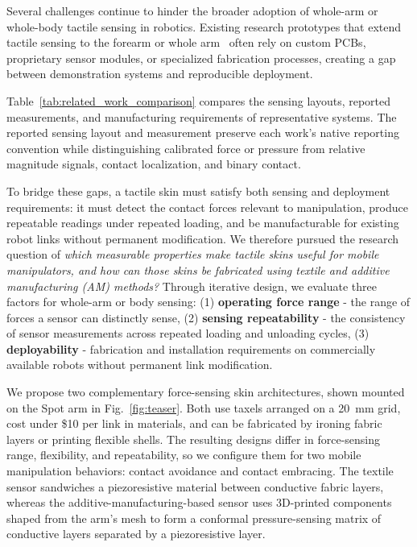 Several challenges continue to hinder the broader adoption of whole-arm or whole-body tactile sensing in robotics. Existing research prototypes that extend tactile sensing to the forearm or whole arm~\cite{6502183,Cyskin,kohlbrenner2024machine} often rely on custom PCBs, proprietary sensor modules, or specialized fabrication processes, creating a gap between demonstration systems and reproducible deployment.

Table~\ref{tab:related_work_comparison} compares the sensing layouts, reported measurements, and manufacturing requirements of representative systems. The reported sensing layout and measurement preserve each work's native reporting convention while distinguishing calibrated force or pressure from relative magnitude signals, contact localization, and binary contact.

To bridge these gaps, a tactile skin must satisfy both sensing and deployment requirements: it must detect the contact forces relevant to manipulation, produce repeatable readings under repeated loading, and be manufacturable for existing robot links without permanent modification. We therefore pursued the research question of \textit{which measurable properties make tactile skins useful for mobile manipulators, and how can those skins be fabricated using textile and additive manufacturing (AM) methods?} Through iterative design, we evaluate three factors for whole-arm or body sensing: (1) \textbf{operating force range} - the range of forces a sensor can distinctly sense, (2) \textbf{sensing repeatability} - the consistency of sensor measurements across repeated loading and unloading cycles, (3) \textbf{deployability} - fabrication and installation requirements on commercially available robots without permanent link modification.

We propose two complementary force-sensing skin architectures, shown mounted on the Spot arm in Fig.~\ref{fig:teaser}. Both use taxels arranged on a 20~mm grid, cost under \$10 per link in materials, and can be fabricated by ironing fabric layers or printing flexible shells. The resulting designs differ in force-sensing range, flexibility, and repeatability, so we configure them for two mobile manipulation behaviors: contact avoidance and contact embracing. The textile sensor sandwiches a piezoresistive material between conductive fabric layers, whereas the additive-manufacturing-based sensor uses 3D-printed components shaped from the arm's mesh to form a conformal pressure-sensing matrix of conductive layers separated by a piezoresistive layer.


